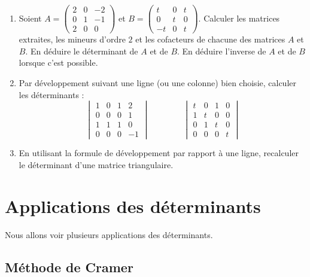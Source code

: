 \documentclass[class=report,crop=false]{standalone}
\begin{document}
\begin{miniexercices}
\sauteligne
\begin{enumerate}
  \item Soient $A=\begin{pmatrix}2&0&-2\\0&1&-1\\2&0&0\end{pmatrix}$
  et $B = \begin{pmatrix}t&0&t\\0&t&0\\-t&0&t\end{pmatrix}$.
  Calculer les matrices extraites, les mineurs d'ordre $2$ et les cofacteurs de chacune
  des matrices $A$ et $B$. En déduire le déterminant de $A$ et de $B$. En déduire
  l'inverse de $A$ et de $B$ lorsque c'est possible.

  \item Par développement suivant une ligne (ou une colonne) bien choisie, calculer les déterminants :
  $$\begin{vmatrix}1&0&1&2\\0&0&0&1\\1&1&1&0\\0&0&0&-1\end{vmatrix}
  \qquad\qquad
  \begin{vmatrix}t&0&1&0\\1&t&0&0\\0&1&t&0\\0&0&0&t\end{vmatrix}$$

  \item En utilisant la formule de développement par rapport à une ligne,
  recalculer le déterminant d'une matrice triangulaire.
\end{enumerate}
\end{miniexercices}

\section{Applications des déterminants}


Nous allons voir plusieurs applications des déterminants.


\subsection{Méthode de Cramer}
\end{document}
